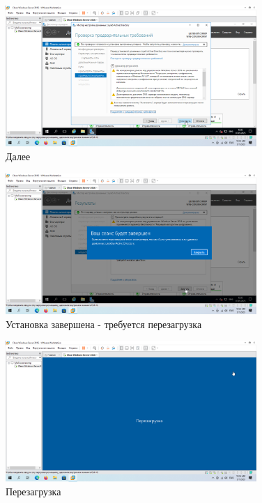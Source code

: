 \documentclass[a4paper]{article}
\begin{document}
  \begin{figure}[H]
    \centering
    \includegraphics[width=0.85\textwidth]{9_0058}
    \caption{Далее}
    \label{img:0058}
  \end{figure}

  \begin{figure}[H]
    \centering
    \includegraphics[width=0.85\textwidth]{9_0059}
    \caption{Установка завершена - требуется перезагрузка}
    \label{img:0059}
  \end{figure}

  \begin{figure}[H]
    \centering
    \includegraphics[width=0.85\textwidth]{9_0060}
    \caption{Перезагрузка}
    \label{img:0060}
  \end{figure}
\end{document}
